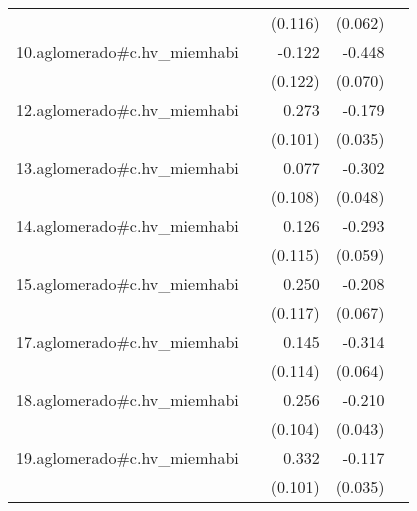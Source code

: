 {\begin{longtable}{l*{4}{D{.}{.}{-1}}}
            &                     &     (0.116)         &     (0.062)         &                     \\
\addlinespace
10.aglomerado#c.hv\_miemhabi&                     &      -0.122         &      -0.448\sym{***}&                     \\
            &                     &     (0.122)         &     (0.070)         &                     \\
\addlinespace
12.aglomerado#c.hv\_miemhabi&                     &       0.273\sym{**} &      -0.179\sym{***}&                     \\
            &                     &     (0.101)         &     (0.035)         &                     \\
\addlinespace
13.aglomerado#c.hv\_miemhabi&                     &       0.077         &      -0.302\sym{***}&                     \\
            &                     &     (0.108)         &     (0.048)         &                     \\
\addlinespace
14.aglomerado#c.hv\_miemhabi&                     &       0.126         &      -0.293\sym{***}&                     \\
            &                     &     (0.115)         &     (0.059)         &                     \\
\addlinespace
15.aglomerado#c.hv\_miemhabi&                     &       0.250\sym{*}  &      -0.208\sym{**} &                     \\
            &                     &     (0.117)         &     (0.067)         &                     \\
\addlinespace
17.aglomerado#c.hv\_miemhabi&                     &       0.145         &      -0.314\sym{***}&                     \\
            &                     &     (0.114)         &     (0.064)         &                     \\
\addlinespace
18.aglomerado#c.hv\_miemhabi&                     &       0.256\sym{*}  &      -0.210\sym{***}&                     \\
            &                     &     (0.104)         &     (0.043)         &                     \\
\addlinespace
19.aglomerado#c.hv\_miemhabi&                     &       0.332\sym{**} &      -0.117\sym{***}&                     \\
            &                     &     (0.101)         &     (0.035)         &                     \\

\end{longtable}}

